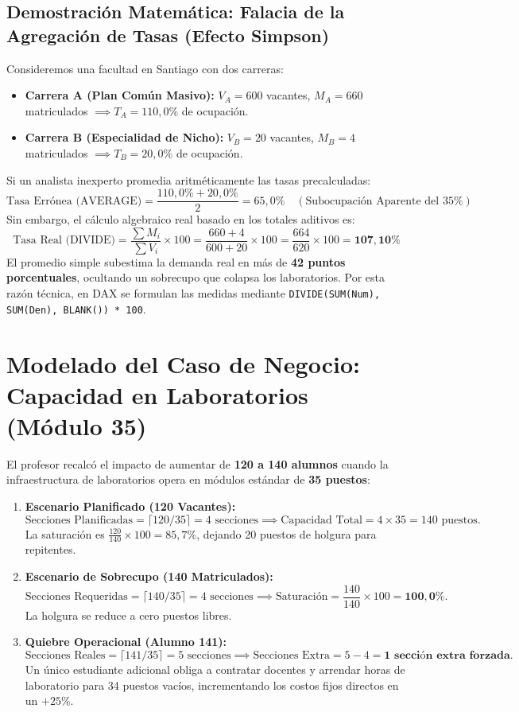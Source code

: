 \documentclass[11pt,a4paper]{article}
\begin{document}
\subsection{Demostración Matemática: Falacia de la Agregación de Tasas (Efecto Simpson)}
Consideremos una facultad en Santiago con dos carreras:
\begin{itemize}
    \item \textbf{Carrera A (Plan Común Masivo):} $V_A = 600$ vacantes, $M_A = 660$ matriculados $\implies T_A = 110,0\%$ de ocupación.
    \item \textbf{Carrera B (Especialidad de Nicho):} $V_B = 20$ vacantes, $M_B = 4$ matriculados $\implies T_B = 20,0\%$ de ocupación.
\end{itemize}

Si un analista inexperto promedia aritméticamente las tasas precalculadas:
\[
\text{Tasa Errónea (AVERAGE)} = \frac{110,0\% + 20,0\%}{2} = 65,0\% \quad (\text{Subocupación Aparente del 35\%})
\]
Sin embargo, el cálculo algebraico real basado en los totales aditivos es:
\[
\text{Tasa Real (DIVIDE)} = \frac{\sum M_i}{\sum V_i} \times 100 = \frac{660 + 4}{600 + 20} \times 100 = \frac{664}{620} \times 100 = \mathbf{107,10\%}
\]
El promedio simple subestima la demanda real en más de \textbf{42 puntos porcentuales}, ocultando un sobrecupo que colapsa los laboratorios. Por esta razón técnica, en DAX se formulan las medidas mediante \texttt{DIVIDE(SUM(Num), SUM(Den), BLANK()) * 100}.

\section{Modelado del Caso de Negocio: Capacidad en Laboratorios (Módulo 35)}

El profesor recalcó el impacto de aumentar de \textbf{120 a 140 alumnos} cuando la infraestructura de laboratorios opera en módulos estándar de \textbf{35 puestos}:

\begin{enumerate}
    \item \textbf{Escenario Planificado (120 Vacantes):}
    \[
    \text{Secciones Planificadas} = \lceil 120 / 35 \rceil = 4 \text{ secciones} \implies \text{Capacidad Total} = 4 \times 35 = 140 \text{ puestos.}
    \]
    La saturación es $\frac{120}{140} \times 100 = 85,7\%$, dejando 20 puestos de holgura para repitentes.
    \item \textbf{Escenario de Sobrecupo (140 Matriculados):}
    \[
    \text{Secciones Requeridas} = \lceil 140 / 35 \rceil = 4 \text{ secciones} \implies \text{Saturación} = \frac{140}{140} \times 100 = \mathbf{100,0\%}.
    \]
    La holgura se reduce a cero puestos libres.
    \item \textbf{Quiebre Operacional (Alumno 141):}
    \[
    \text{Secciones Reales} = \lceil 141 / 35 \rceil = 5 \text{ secciones} \implies \text{Secciones Extra} = 5 - 4 = \mathbf{1 \text{ sección extra forzada.}}
    \]
    Un único estudiante adicional obliga a contratar docentes y arrendar horas de laboratorio para 34 puestos vacíos, incrementando los costos fijos directos en un $+25\%$.
\end{enumerate}
\end{document}
